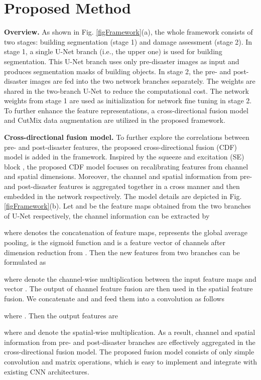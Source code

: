 \documentclass{article}
\begin{document}
\section{Proposed Method}
\label{secMethod}
\textbf{Overview.} 
As shown in Fig. \ref{figFramework}(a), the whole framework consists of two stages: building segmentation (stage 1) and damage assessment (stage 2). In stage 1, a single U-Net branch (i.e., the upper one) is used for building segmentation. This U-Net branch uses only pre-disaster images as input and produces segmentation masks of building objects. In stage 2, the pre- and post-disaster images are fed into the two network branches separately.
The weights are shared in the two-branch U-Net to reduce the computational cost. The network weights from stage 1 are used as initialization for network fine tuning in stage 2. To further enhance the feature representations, a cross-directional fusion model and CutMix data augmentation are utilized in the proposed framework.

\textbf{Cross-directional fusion model.} To further explore the correlations between pre- and post-disaster features, the proposed cross-directional fusion (CDF) model is added in the framework. Inspired by the squeeze and excitation (SE) block \cite{guha2018recalibrating}, the proposed CDF model focuses on recalibrating features from channel and spatial dimensions. 
Moreover, the channel and spatial information from  pre- and post-disaster features is aggregated together in a cross manner and then embedded in the network respectively. The model details are depicted in Fig. \ref{figFramework}(b). Let  and  be the feature maps obtained from the two branches of U-Net respectively, the channel information can be extracted by

where  denotes the concatenation of feature maps,  represents the global average pooling,   is the sigmoid function and 
is a feature vector of  channels after dimension reduction from . Then the new features from two branches can be formulated as

where  denote the channel-wise multiplication between the input feature maps and vector . The output of channel feature fusion are then used in the spatial feature fusion. We concatenate  and  and feed them into a  convolution  as follows

where .
Then the output features are 

where  and  denote the spatial-wise multiplication. As a result, channel and spatial information from pre- and post-disaster branches are effectively aggregated in the cross-directional fusion model.
The proposed fusion model consists of only simple convolution and matrix operations, which is easy to implement and integrate with existing CNN architectures. 
\end{document}
